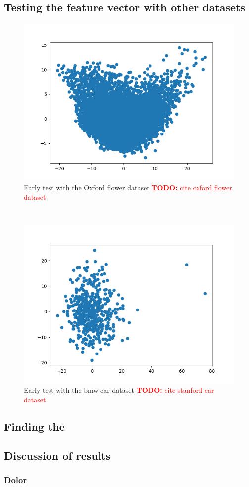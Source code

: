\documentclass[journal]{vgtc}       %
\newcommand{\todo}[1]{\textcolor{red}{\textbf{TODO:} #1}}
\begin{document}
\subsection{Testing the feature vector with other datasets}
\begin{figure}
  \begin{center}
  \includegraphics[width=.6\linewidth]{Figure1.png}
  \end{center}
  \caption{\label{fig:lorem} Early test with the Oxford flower dataset \todo{cite oxford flower dataset}}
\end{figure} ~ \\
\begin{figure}
  \begin{center}
  \includegraphics[width=.6\linewidth]{Figure2.png}
  \end{center}
  \caption{\label{fig:bmw} Early test with the bmw car dataset \todo{cite stanford car dataset}\cite{stanfordcar}}
\end{figure}
\subsection{Finding the }
\subsection{Discussion of results}
\subsubsection{Dolor}
\end{document}
